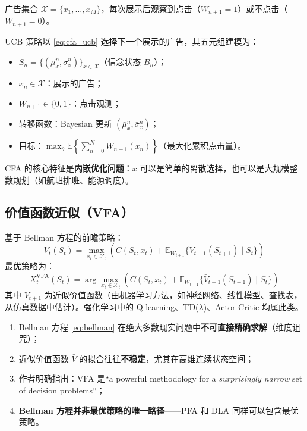 \documentclass[11pt, a4paper]{article}
\begin{document}
\begin{tcolorbox}[scenariobox, title={CFA 应用——在线广告选择（多臂赌博机）}]
广告集合 $\mathcal{X} = \{x_1, \ldots, x_M\}$，每次展示后观察到点击（$W_{n+1}=1$）或不点击（$W_{n+1}=0$）。

UCB 策略以 \eqref{eq:cfa_ucb} 选择下一个展示的广告，其五元组建模为：
\begin{itemize}[leftmargin=1.5em, itemsep=1pt]
  \item $S_n = \{(\bar{\mu}_x^n, \bar{\sigma}_x^n)\}_{x \in \mathcal{X}}$（信念状态 $B_n$）；
  \item $x_n \in \mathcal{X}$：展示的广告；
  \item $W_{n+1} \in \{0,1\}$：点击观测；
  \item 转移函数：Bayesian 更新 $(\bar{\mu}_x^n, \bar{\sigma}_x^n)$；
  \item 目标：$\max_\theta \mathbb{E}\!\left\{\sum_{n=0}^{N} W_{n+1}(x_n)\right\}$（最大化累积点击量）。
\end{itemize}
\end{tcolorbox}

CFA 的核心特征是\textbf{内嵌优化问题}：$x$ 可以是简单的离散选择，也可以是大规模整数规划（如航班排班、能源调度）。

\subsection{价值函数近似（VFA）}

基于 Bellman 方程的前瞻策略：
\begin{equation}
  V_t(S_t) = \max_{x_t \in \mathcal{X}_t}\!\left(C(S_t, x_t) + \mathbb{E}_{W_{t+1}}\!\{V_{t+1}(S_{t+1}) \mid S_t\}\right)
  \label{eq:bellman}
\end{equation}
最优策略为：
\begin{equation}
  X_t^{\text{VFA}}(S_t) = \arg\max_{x_t \in \mathcal{X}_t}\!\left(C(S_t, x_t) + \mathbb{E}_{W_{t+1}}\!\{\bar{V}_{t+1}(S_{t+1}) \mid S_t\}\right)
  \label{eq:vfa_policy}
\end{equation}
其中 $\bar{V}_{t+1}$ 为近似价值函数（由机器学习方法，如神经网络、线性模型、查找表，从仿真数据中估计）。强化学习中的 Q-learning、TD($\lambda$)、Actor-Critic 均属此类。

\begin{tcolorbox}[warnbox={重要警示（对 VFA/RL 研究者的反思）}]
\begin{enumerate}[leftmargin=1.5em, label=\textbullet, itemsep=1pt]
  \item Bellman 方程 \eqref{eq:bellman} 在绝大多数现实问题中\textbf{不可直接精确求解}（维度诅咒）；
  \item 近似价值函数 $\bar{V}$ 的拟合往往\textbf{不稳定}，尤其在高维连续状态空间；
  \item 作者明确指出：VFA 是``a powerful methodology for a \emph{surprisingly narrow} set of decision problems''；
  \item \textbf{Bellman 方程并非最优策略的唯一路径}——PFA 和 DLA 同样可以包含最优策略。
\end{enumerate}
\end{tcolorbox}
\end{document}
